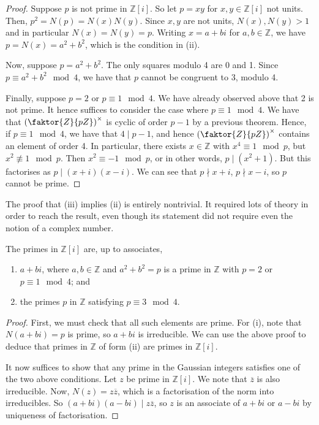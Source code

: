 \begin{proof}
    Suppose \( p \) is not prime in \( \mathbb Z[i] \).
    So let \( p = xy \) for \( x, y \in \mathbb Z[i] \) not units.
    Then, \( p^2 = N(p) = N(x)N(y) \).
    Since \( x, y \) are not units, \( N(x), N(y) > 1 \) and in particular \( N(x) = N(y) = p \).
    Writing \( x = a+bi \) for \( a, b \in \mathbb Z \), we have \( p = N(x) = a^2 + b^2 \), which is the condition in (ii).

    Now, suppose \( p = a^2 + b^2 \).
    The only squares modulo 4 are 0 and 1.
    Since \( p \equiv a^2 + b^2 \mod 4 \), we have that \( p \) cannot be congruent to 3, modulo 4.

    Finally, suppose \( p = 2 \) or \( p \equiv 1 \mod 4 \).
    We have already observed above that 2 is not prime.
    It hence suffices to consider the case where \( p \equiv 1 \mod 4 \).
    We have that \( \qty(\faktor{Z}{pZ})^\times \) is cyclic of order \( p-1 \) by a previous theorem.
    Hence, if \( p \equiv 1 \mod 4 \), we have that \( 4 \mid p-1 \), and hence \( \qty(\faktor{Z}{pZ})^\times \) contains an element of order 4.
    In particular, there exists \( x \in \mathbb Z \) with \( x^4 \equiv 1 \mod p \), but \( x^2 \not\equiv 1 \mod p \).
    Then \( x^2 \equiv -1 \mod p \), or in other words, \( p \mid (x^2 + 1) \).
    But this factorises as \( p \mid (x+i)(x-i) \).
    We can see that \( p \nmid x+i \), \( p \nmid x-i \), so \( p \) cannot be prime.
\end{proof}
\begin{remark}
    The proof that (iii) implies (ii) is entirely nontrivial.
    It required lots of theory in order to reach the result, even though its statement did not require even the notion of a complex number.
\end{remark}
\begin{theorem}
    The primes in \( \mathbb Z[i] \) are, up to associates,
    \begin{enumerate}
        \item \( a + bi \), where \( a, b \in \mathbb Z \) and \( a^2 + b^2 = p \) is a prime in \( \mathbb Z \) with \( p = 2 \) or \( p \equiv 1 \mod 4 \); and
        \item the primes \( p \) in \( \mathbb Z \) satisfying \( p \equiv 3 \mod 4 \).
    \end{enumerate}
\end{theorem}
\begin{proof}
    First, we must check that all such elements are prime.
    For (i), note that \( N(a+bi) = p \) is prime, so \( a+bi \) is irreducible.
    We can use the above proof to deduce that primes in \( \mathbb Z \) of form (ii) are primes in \( \mathbb Z[i] \).

    It now suffices to show that any prime in the Gaussian integers satisfies one of the two above conditions.
    Let \( z \) be prime in \( \mathbb Z[i] \).
    We note that \( \overline z \) is also irreducible.
    Now, \( N(z) = z\overline z \), which is a factorisation of the norm into irreducibles.
	So \( (a+bi)(a-bi) \mid z \overline z \), so \( z \) is an associate of \( a+bi \) or \( a-bi \) by uniqueness of factorisation.
\end{proof}
